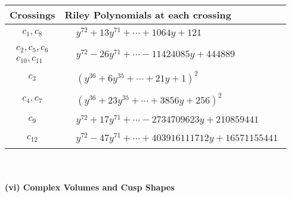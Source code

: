 \documentclass[1p]{elsarticle_modified}
\theoremstyle{definition}
\begin{document}
\begin{tabular}{m{50pt}|m{274pt}}
Crossings & \hspace{64pt}Riley Polynomials at each crossing \\
\hline $$\begin{aligned}c_{1},c_{8}\end{aligned}$$&$\begin{aligned}
&y^{72}+13 y^{71}+\cdots+1064 y+121
\end{aligned}$\\
\hline $$\begin{aligned}c_{2},c_{5},c_{6}\\c_{10},c_{11}\end{aligned}$$&$\begin{aligned}
&y^{72}-26 y^{71}+\cdots-11424085 y+444889
\end{aligned}$\\
\hline $$\begin{aligned}c_{3}\end{aligned}$$&$\begin{aligned}
&(y^{36}+6 y^{35}+\cdots+21 y+1)^{2}
\end{aligned}$\\
\hline $$\begin{aligned}c_{4},c_{7}\end{aligned}$$&$\begin{aligned}
&(y^{36}+23 y^{35}+\cdots+3856 y+256)^{2}
\end{aligned}$\\
\hline $$\begin{aligned}c_{9}\end{aligned}$$&$\begin{aligned}
&y^{72}+17 y^{71}+\cdots-2734709623 y+210859441
\end{aligned}$\\
\hline $$\begin{aligned}c_{12}\end{aligned}$$&$\begin{aligned}
&y^{72}-47 y^{71}+\cdots+403916111712 y+16571155441
\end{aligned}$\\
\hline
\end{tabular}\\~\\
\newpage\flushleft \textbf{(vi) Complex Volumes and Cusp Shapes}
\end{document}
